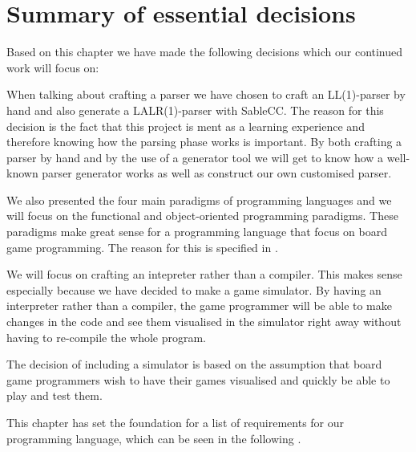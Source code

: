 \section{Summary of essential decisions}
\label{sec:summaryofdecisions}

Based on this chapter we have made the following decisions which our
continued work will focus on:

When talking about crafting a parser we have chosen to craft an LL(1)-parser by 
hand and also generate a LALR(1)-parser with SableCC. The reason for this decision 
is the fact that this
project is ment as a learning experience and therefore knowing how the parsing
phase works is important. By both crafting a parser by hand and by the use of a
generator tool we will get to know how a well-known parser generator works as
well as construct our own customised parser.

We also presented the four main paradigms of programming languages and we will 
focus on the functional and object-oriented programming
paradigms. These paradigms make great sense for a programming language that
focus on board game programming. The reason for this 
is specified in .

We will focus on crafting an intepreter rather than a compiler. This
makes sense especially because we have decided to make a game simulator.
By having an interpreter rather than a compiler, the game programmer will be
able to make changes in the code and see them visualised in the simulator right
away without having to re-compile the whole program.

The decision of including a simulator is based on the assumption that board game
programmers wish to have their games visualised and quickly be able to play and
test them.

This chapter has set the foundation for a list of requirements for
our programming language, which can be seen in the following
.

